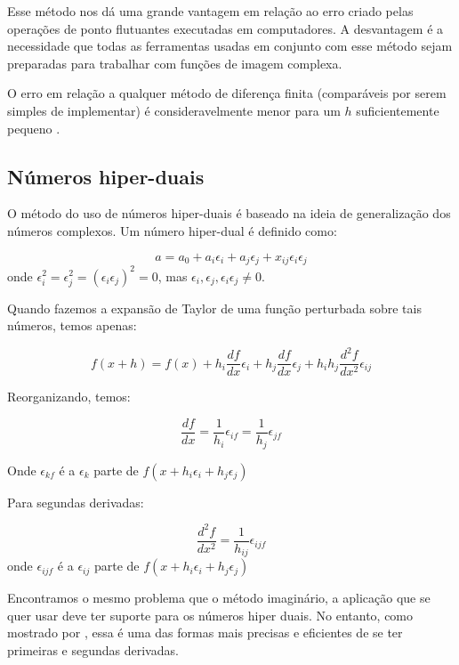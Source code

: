 Esse método nos dá uma grande vantagem em relação ao erro criado pelas operações de ponto flutuantes
executadas em computadores. A desvantagem é a necessidade que todas as ferramentas usadas em
conjunto com esse método sejam preparadas para trabalhar com funções de imagem complexa.

O erro em relação a qualquer método de diferença finita (comparáveis por serem simples de implementar)
é consideravelmente menor para um \(h\) suficientemente pequeno \cite{caplan2011numerical}.

\subsection{Números hiper-duais}
O método do uso de números hiper-duais \cite{Fike_2011} é baseado na ideia de generalização dos números complexos.
Um número hiper-dual é definido como:

\begin{equation}
a = a_0 + a_i\epsilon_i + a_j\epsilon_j + x_{ij}\epsilon_i \epsilon_j
\end{equation}
onde \(\epsilon_i^2 = \epsilon_j^2 = (\epsilon_i\epsilon_j)^2 = 0\), mas \( \epsilon_i, \epsilon_j, \epsilon_i\epsilon_j  \neq 0\).

Quando fazemos a expansão de Taylor de uma função perturbada sobre tais números, temos apenas:

\begin{equation}
f(x+ h) = f(x) + h_i \frac{df}{dx} \epsilon_i + h_j \frac{df}{dx} \epsilon_j +    h_ih_j \frac{d^2f}{dx^2} \epsilon_{ij}
\end{equation}

Reorganizando, temos:

\begin{equation}
  \frac{df}{dx} = \frac{1}{h_i} \epsilon_{if} = \frac{1}{h_j} \epsilon_{jf}
\end{equation}


Onde \(\epsilon_{kf}\) é a \(\epsilon_k\) parte de \( f(x + h_i\epsilon_i + h_j\epsilon_j) \)

Para segundas derivadas:

\begin{equation}
\frac{d^2f}{dx^2} = \frac{1}{h_{ij}} \epsilon_{ijf}
\end{equation}
onde \(\epsilon_{ijf}\) é a \(\epsilon_{ij}\) parte de \( f(x + h_i\epsilon_i + h_j\epsilon_j) \)

Encontramos o mesmo problema que o método imaginário, a aplicação que se quer usar deve ter
suporte para os números hiper duais. No entanto, como mostrado por \citeauthor{Fike_2011}, essa
é uma das formas mais precisas e eficientes de se ter primeiras e segundas derivadas.
